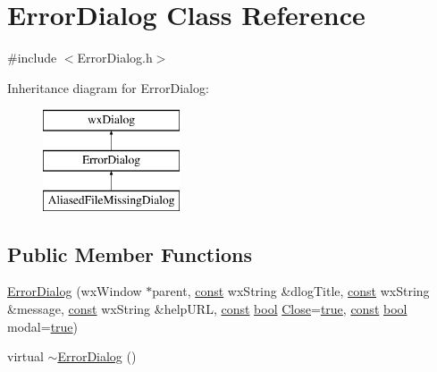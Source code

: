 \hypertarget{class_error_dialog}{}\section{Error\+Dialog Class Reference}
\label{class_error_dialog}


{\ttfamily \#include $<$Error\+Dialog.\+h$>$}

Inheritance diagram for Error\+Dialog\+:\begin{figure}[H]
\begin{center}
\leavevmode
\includegraphics[height=3.000000cm]{class_error_dialog}
\end{center}
\end{figure}
\subsection*{Public Member Functions}
\begin{DoxyCompactItemize}
\item 
\hyperlink{class_error_dialog_a8b06946af6ef67d6d0e244195ce55f6c}{Error\+Dialog} (wx\+Window $\ast$parent, \hyperlink{getopt1_8c_a2c212835823e3c54a8ab6d95c652660e}{const} wx\+String \&dlog\+Title, \hyperlink{getopt1_8c_a2c212835823e3c54a8ab6d95c652660e}{const} wx\+String \&message, \hyperlink{getopt1_8c_a2c212835823e3c54a8ab6d95c652660e}{const} wx\+String \&help\+U\+RL, \hyperlink{getopt1_8c_a2c212835823e3c54a8ab6d95c652660e}{const} \hyperlink{mac_2config_2i386_2lib-src_2libsoxr_2soxr-config_8h_abb452686968e48b67397da5f97445f5b}{bool} \hyperlink{portburn__winxp_8cpp_ad6f32ac62ea277a3e8a068ed1faeee1f}{Close}=\hyperlink{mac_2config_2i386_2lib-src_2libsoxr_2soxr-config_8h_a41f9c5fb8b08eb5dc3edce4dcb37fee7}{true}, \hyperlink{getopt1_8c_a2c212835823e3c54a8ab6d95c652660e}{const} \hyperlink{mac_2config_2i386_2lib-src_2libsoxr_2soxr-config_8h_abb452686968e48b67397da5f97445f5b}{bool} modal=\hyperlink{mac_2config_2i386_2lib-src_2libsoxr_2soxr-config_8h_a41f9c5fb8b08eb5dc3edce4dcb37fee7}{true})
\item 
virtual \hyperlink{class_error_dialog_a1f046e64d78389ea83d093e3365518ed}{$\sim$\+Error\+Dialog} ()
\end{DoxyCompactItemize}


